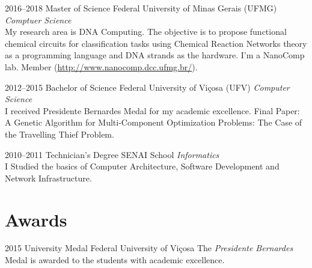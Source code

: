 \documentclass[a4paper]{cv-friggeri-x}
\begin{document}
\begin{entrylist}

\entry
    {2016--2018}
    {Master {\normalfont of Science}}
    {Federal University of Minas Gerais (UFMG)}
    {\emph{Comptuer Science}\\
    My research area is DNA Computing. The objective is to propose functional chemical circuits for classification tasks using Chemical Reaction Networks theory as a programming language and DNA strands as the hardware. I'm a NanoComp lab. Member (\href{http://www.nanocomp.dcc.ufmg.br/}{http://www.nanocomp.dcc.ufmg.br/}).}

\entry
    {2012--2015}
    {Bachelor {\normalfont of Science}}
    {Federal University of Vi\c cosa (UFV)}
    {\emph{Computer Science}\\
    I received Presidente Bernardes Medal for my academic excellence. Final Paper: A Genetic Algorithm for Multi-Component Optimization Problems: The Case of the Travelling Thief Problem.}


\entry
    {2010--2011}
    {Technician's {\normalfont Degree}}
    {SENAI School}
    {\emph{Informatics}\\
    I Studied the basics of Computer Architecture, Software Development and Network Infrastructure.}



\end{entrylist}


\section{Awards}

\begin{entrylist}


\entry
    {2015}
    {University Medal}
    {Federal University of Vi\c cosa}
    {The \textit{Presidente Bernardes} Medal is awarded to the students with academic excellence.}


\end{entrylist}
\end{document}
